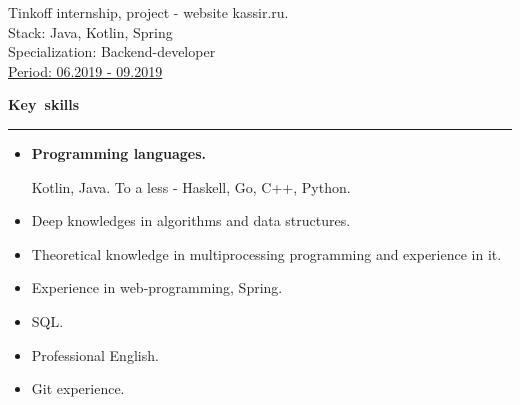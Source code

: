 \documentclass[10pt, a4paper]{report}
\begin{document}
    Tinkoff internship, project - website kassir.ru. \\
    Stack: Java, Kotlin, Spring \\
    Specialization: Backend-developer \\
    \underline{Period: 06.2019 - 09.2019} \\

    \par\hbox{\large\textbf{Key skills}}\kern5pt\hrule\kern5pt

    \begin{itemize}

        \item \textbf{Programming languages.}

        Kotlin, Java. To a less - Haskell, Go, C++, Python.

        
        \item Deep knowledges in algorithms and data structures.
        \item Theoretical knowledge in multiprocessing programming and experience in it.
        \item Experience in web-programming, Spring.
        \item SQL.
        \item Professional English.
        \item Git experience.
        \\
    \end{itemize}
\end{document}
